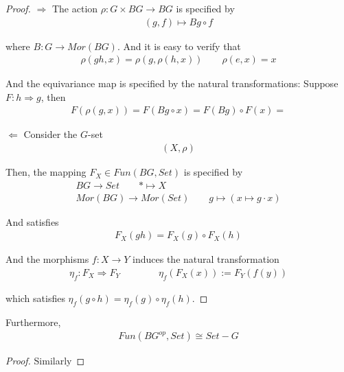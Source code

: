 \documentclass[Total.tex]{subfiles}
\begin{document}
				\begin{proof}
					$\Rightarrow$ The action $\rho:G\times BG\rightarrow BG$ is specified by
					\begin{gather*}
						(g,f)\mapsto Bg\circ f
					\end{gather*}
					
					where $B:G\rightarrow Mor(BG)$. And it is easy to verify that 
					\begin{gather*}
						\rho(gh,x)=\rho(g,\rho(h,x))\qquad \rho(e,x)=x
					\end{gather*}
					
					And the equivariance map is specified by the natural transformations: Suppose $F:h\Rightarrow g$, then
					\begin{gather*}
						F(\rho(g,x))=F(Bg\circ x)=F(Bg)\circ F(x)=
					\end{gather*}
					
					$\Leftarrow$ Consider the $G$-set
					\begin{gather*}
						(X,\rho)
					\end{gather*}
					
					Then, the mapping $F_X\in Fun(BG,Set)$ is specified by
					\begin{gather*}
						BG\rightarrow Set\qquad *\mapsto X\\
						Mor(BG)\rightarrow Mor(Set)\qquad g\mapsto (x\mapsto g\cdot x)
					\end{gather*}
					
					And satisfies
					\begin{gather*}
						F_X(gh)=F_X(g)\circ F_X(h)
					\end{gather*}
					
					And the morphisms $f:X\rightarrow Y$ induces the natural transformation
					\begin{gather*}
						\eta_f: F_X\Rightarrow F_Y\qquad \qquad \eta_f(F_X(x)):=F_Y(f(y))
					\end{gather*}
					
					which satisfies $\eta_f(g\circ h)=\eta_f(g)\circ \eta_f(h)$. 
				\end{proof}
				
				\begin{corollary}
					Furthermore,
					\begin{gather*}
						Fun(BG^{op},Set)\cong Set-G
					\end{gather*}
				\end{corollary}
				\begin{proof}
					Similarly
				\end{proof}
				
\end{document}
